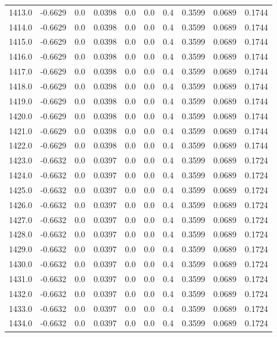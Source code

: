 \begin{longtable}{lrrrrrrrrr}
1413.0 & -0.6629 & 0.0 & 0.0398 & 0.0 & 0.0 & 0.4 & 0.3599 & 0.0689 & 0.1744 \\
1414.0 & -0.6629 & 0.0 & 0.0398 & 0.0 & 0.0 & 0.4 & 0.3599 & 0.0689 & 0.1744 \\
1415.0 & -0.6629 & 0.0 & 0.0398 & 0.0 & 0.0 & 0.4 & 0.3599 & 0.0689 & 0.1744 \\
1416.0 & -0.6629 & 0.0 & 0.0398 & 0.0 & 0.0 & 0.4 & 0.3599 & 0.0689 & 0.1744 \\
1417.0 & -0.6629 & 0.0 & 0.0398 & 0.0 & 0.0 & 0.4 & 0.3599 & 0.0689 & 0.1744 \\
1418.0 & -0.6629 & 0.0 & 0.0398 & 0.0 & 0.0 & 0.4 & 0.3599 & 0.0689 & 0.1744 \\
1419.0 & -0.6629 & 0.0 & 0.0398 & 0.0 & 0.0 & 0.4 & 0.3599 & 0.0689 & 0.1744 \\
1420.0 & -0.6629 & 0.0 & 0.0398 & 0.0 & 0.0 & 0.4 & 0.3599 & 0.0689 & 0.1744 \\
1421.0 & -0.6629 & 0.0 & 0.0398 & 0.0 & 0.0 & 0.4 & 0.3599 & 0.0689 & 0.1744 \\
1422.0 & -0.6629 & 0.0 & 0.0398 & 0.0 & 0.0 & 0.4 & 0.3599 & 0.0689 & 0.1744 \\
1423.0 & -0.6632 & 0.0 & 0.0397 & 0.0 & 0.0 & 0.4 & 0.3599 & 0.0689 & 0.1724 \\
1424.0 & -0.6632 & 0.0 & 0.0397 & 0.0 & 0.0 & 0.4 & 0.3599 & 0.0689 & 0.1724 \\
1425.0 & -0.6632 & 0.0 & 0.0397 & 0.0 & 0.0 & 0.4 & 0.3599 & 0.0689 & 0.1724 \\
1426.0 & -0.6632 & 0.0 & 0.0397 & 0.0 & 0.0 & 0.4 & 0.3599 & 0.0689 & 0.1724 \\
1427.0 & -0.6632 & 0.0 & 0.0397 & 0.0 & 0.0 & 0.4 & 0.3599 & 0.0689 & 0.1724 \\
1428.0 & -0.6632 & 0.0 & 0.0397 & 0.0 & 0.0 & 0.4 & 0.3599 & 0.0689 & 0.1724 \\
1429.0 & -0.6632 & 0.0 & 0.0397 & 0.0 & 0.0 & 0.4 & 0.3599 & 0.0689 & 0.1724 \\
1430.0 & -0.6632 & 0.0 & 0.0397 & 0.0 & 0.0 & 0.4 & 0.3599 & 0.0689 & 0.1724 \\
1431.0 & -0.6632 & 0.0 & 0.0397 & 0.0 & 0.0 & 0.4 & 0.3599 & 0.0689 & 0.1724 \\
1432.0 & -0.6632 & 0.0 & 0.0397 & 0.0 & 0.0 & 0.4 & 0.3599 & 0.0689 & 0.1724 \\
1433.0 & -0.6632 & 0.0 & 0.0397 & 0.0 & 0.0 & 0.4 & 0.3599 & 0.0689 & 0.1724 \\
1434.0 & -0.6632 & 0.0 & 0.0397 & 0.0 & 0.0 & 0.4 & 0.3599 & 0.0689 & 0.1724 \\

\end{longtable}
